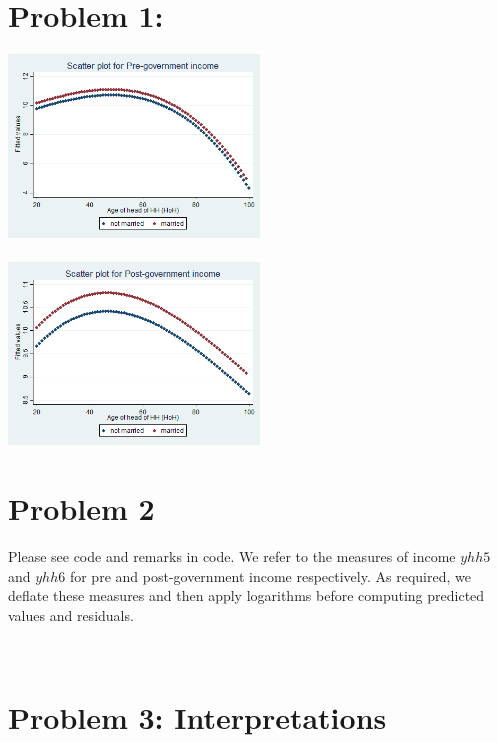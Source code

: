 \documentclass[12pt,a4paper]{article}
\begin{document}
\newpage


\section*{Problem 1: }

\includegraphics[width=0.5\textwidth]{PS4/graphs/smoothed_yy5b_hat.png}\\ \\
\includegraphics[width=0.5\textwidth]{PS4/graphs/smoothed_yy6b_hat.png}

\section*{Problem 2}
Please see code and remarks in code. We refer to the measures of income $yhh5$ and $yhh6$ for pre and post-government income respectively. As required, we deflate these measures and then apply logarithms before computing predicted values and residuals. 

\\

\section*{Problem 3: Interpretations}
\end{document}
